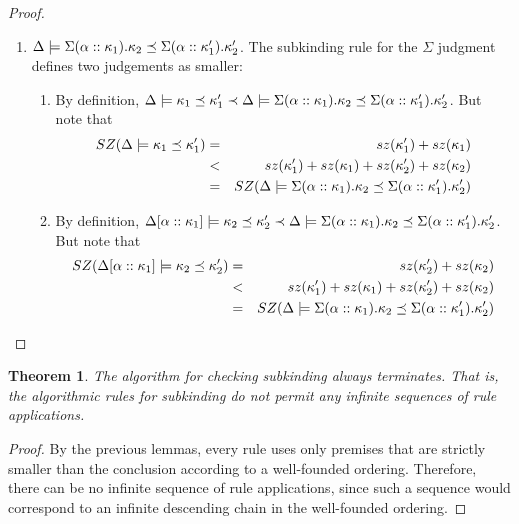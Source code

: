 \documentclass[12pt,twoside,fleqn]{amsart}
\theoremstyle{plain}
\newtheorem{thm}{Theorem}
\theoremstyle{plain}
\theoremstyle{definition}
\begin{document}
\begin{proof}
\begin{enumerate}
\begin{enumerate}
\end{enumerate}
\item \( \Delta  \models \Sigma (\alpha ::\kappa _{1}).\kappa _{2} \preceq \Sigma (\alpha ::\kappa _{1}').\kappa _{2}' \).
The subkinding rule for the \( \Sigma  \) judgment defines two judgements as
smaller:

\begin{enumerate}
\item By definition, \( \Delta  \models \kappa _{1} \preceq \kappa _{1}'\prec \Delta  \models \Sigma (\alpha ::\kappa _{1}).\kappa _{2} \preceq \Sigma (\alpha ::\kappa _{1}').\kappa _{2}' \).
But note that 
\begin{eqnarray*}
SZ(\Delta  \models \kappa _{1} \preceq \kappa _{1}') & = & sz(\kappa _{1}')+sz(\kappa _{1})\\
 & < & sz(\kappa _{1}')+sz(\kappa _{1})+sz(\kappa _{2}')+sz(\kappa _{2})\\
 & = & SZ(\Delta  \models \Sigma (\alpha ::\kappa _{1}).\kappa _{2} \preceq \Sigma (\alpha ::\kappa _{1}').\kappa _{2}')
\end{eqnarray*}

\item By definition, \( \Delta  [\alpha   ::\kappa _{1}  ] \models \kappa _{2} \preceq \kappa _{2}'\prec \Delta  \models \Sigma (\alpha ::\kappa _{1}).\kappa _{2} \preceq \Sigma (\alpha ::\kappa _{1}').\kappa _{2}' \).
But note that 
\begin{eqnarray*}
SZ(\Delta  [\alpha   ::\kappa _{1}  ] \models \kappa _{2} \preceq \kappa _{2}') & = & sz(\kappa _{2}')+sz(\kappa _{2})\\
 & < & sz(\kappa _{1}')+sz(\kappa _{1})+sz(\kappa _{2}')+sz(\kappa _{2})\\
 & = & SZ(\Delta  \models \Sigma (\alpha ::\kappa _{1}).\kappa _{2} \preceq \Sigma (\alpha ::\kappa _{1}').\kappa _{2}')
\end{eqnarray*}

\end{enumerate}
\end{enumerate}
\end{proof}
\begin{thm}
\label{thm:subkindTerm}The algorithm for checking subkinding always terminates.
That is, the algorithmic rules for subkinding do not permit any infinite sequences
of rule applications. 
\end{thm}
\begin{proof}
By the previous lemmas, every rule uses only premises that are strictly smaller
than the conclusion according to a well-founded ordering. Therefore, there can
be no infinite sequence of rule applications, since such a sequence would correspond
to an infinite descending chain in the well-founded ordering.
\end{proof}
\end{document}
